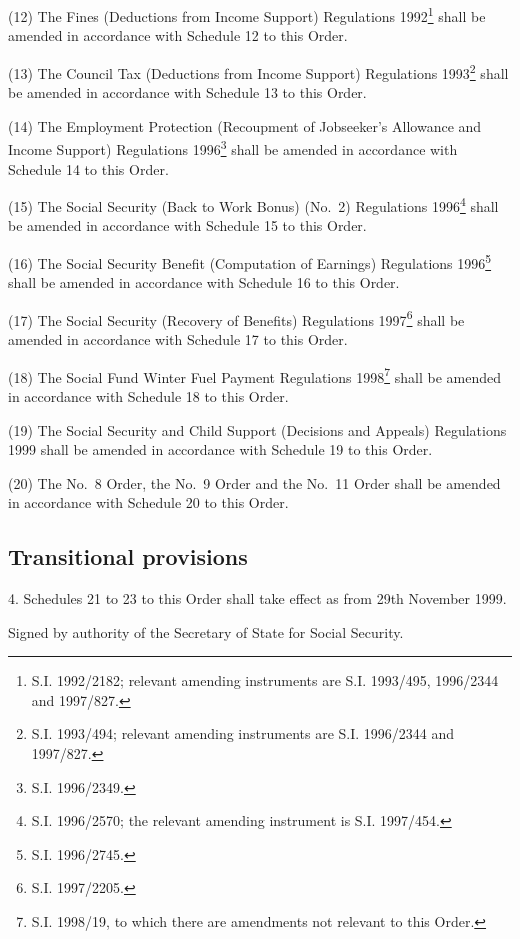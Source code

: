 \documentclass[12pt,a4paper]{article}
\begin{document}
(12) The Fines (Deductions from Income Support) Regulations 1992\footnote{\frenchspacing S.I. 1992/2182; relevant amending instruments are S.I. 1993/495, 1996/2344 and 1997/827.} shall be amended in accordance with Schedule 12 to this Order.

(13) The Council Tax (Deductions from Income Support) Regulations 1993\footnote{\frenchspacing S.I. 1993/494; relevant amending instruments are S.I. 1996/2344 and 1997/827.} shall be amended in accordance with Schedule 13 to this Order.

(14) The Employment Protection (Recoupment of Jobseeker’s Allowance and Income Support) Regulations 1996\footnote{\frenchspacing S.I. 1996/2349.} shall be amended in accordance with Schedule 14 to this Order.

(15) The Social Security (Back to Work Bonus) (No.\ 2) Regulations 1996\footnote{\frenchspacing S.I. 1996/2570; the relevant amending instrument is S.I. 1997/454.} shall be amended in accordance with Schedule 15 to this Order.

(16) The Social Security Benefit (Computation of Earnings) Regulations 1996\footnote{\frenchspacing S.I. 1996/2745.} shall be amended in accordance with Schedule 16 to this Order.

(17) The Social Security (Recovery of Benefits) Regulations 1997\footnote{\frenchspacing S.I. 1997/2205.} shall be amended in accordance with Schedule 17 to this Order.

(18) The Social Fund Winter Fuel Payment Regulations 1998\footnote{\frenchspacing S.I. 1998/19, to which there are amendments not relevant to this Order.} shall be amended in accordance with Schedule 18 to this Order.

(19) The Social Security and Child Support (Decisions and Appeals) Regulations 1999 shall be amended in accordance with Schedule 19 to this Order.

(20) The No.\ 8 Order, the No.\ 9 Order and the No.\ 11 Order shall be amended in accordance with Schedule 20 to this Order.

\subsection[4. Transitional provisions]{Transitional provisions}

4.  Schedules 21 to 23 to this Order shall take effect as from 29th November 1999. 

\bigskip

Signed 
by authority of the Secretary of State for Social Security.
\end{document}
